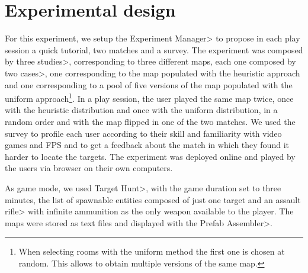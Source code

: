 
\section{Experimental design}

For this experiment, we setup the \<Experiment Manager> to propose in each play session a quick tutorial, two matches and a survey. The experiment was composed by three \<studies>, corresponding to three different maps, each one composed by two \<cases>, one corresponding to the map populated with the heuristic approach and one corresponding to a pool of five versions of the map populated with the uniform approach\footnote{When selecting rooms with the uniform method the first one is chosen at random. This allows to obtain multiple versions of the same map.}. In a play session, the user played the same map twice, once with the heuristic distribution and once with the uniform distribution, in a random order and with the map flipped in one of the two matches. We used the survey to profile each user according to their skill and familiarity with video games and FPS and to get a feedback about the match in which they found it harder to locate the targets. The experiment was deployed online and played by the users via browser on their own computers.

\par

As game mode, we used \<Target Hunt>, with the game duration set to three minutes, the list of spawnable entities composed of just one target and an \<assault rifle> with infinite ammunition as the only weapon available to the player. The maps were stored as text files and displayed with the \<Prefab Assembler>. 

\par

